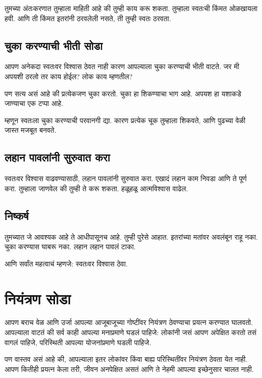 तुमच्या अंतःकरणात तुम्हाला माहिती आहे की तुम्ही काय करू शकता. 
तुम्हाला स्वतःची किंमत ओळखायला हवी. 
आणि ती किंमत इतरांनी ठरवलेली नसते, 
ती तुम्ही स्वतः ठरवता. 

\section*{चुका करण्याची भीती सोडा}
आपण अनेकदा स्वतःवर विश्वास ठेवत नाही कारण 
आपल्याला चुका करण्याची भीती वाटते. 
जर मी अपयशी ठरलो तर काय होईल? 
लोक काय म्हणतील? 

पण सत्य असं आहे की प्रत्येकजण चुका करतो. 
चुका हा शिकण्याचा भाग आहे. 
अपयश हा यशाकडे जाण्याचा एक टप्पा आहे. 

म्हणून स्वतःला चुका करण्याची परवानगी द्या. 
कारण प्रत्येक चूक तुम्हाला शिकवते, 
आणि पुढच्या वेळी जास्त मजबूत बनवते. 

\section*{लहान पावलांनी सुरुवात करा}
स्वतःवर विश्वास वाढवण्यासाठी, 
लहान पावलांनी सुरुवात करा. 
एखादं लहान काम निवडा आणि ते पूर्ण करा. 
तुम्हाला जाणवेल की तुम्ही ते करू शकता. 
हळूहळू आत्मविश्वास वाढेल. 

\section*{निष्कर्ष}
तुमच्यात जे आवश्यक आहे ते आधीपासूनच आहे. 
तुम्ही पुरेसे आहात. 
इतरांच्या मतांवर अवलंबून राहू नका. 
चुका करण्यास घाबरू नका. 
लहान लहान पावलं टाका. 

आणि सर्वांत महत्वाचं म्हणजे: 
स्वतःवर विश्वास ठेवा. 



\chapter{नियंत्रण सोडा}

आपण बराच वेळ आणि उर्जा आपल्या आजूबाजूच्या गोष्टींवर नियंत्रण ठेवण्याचा प्रयत्न करण्यात घालवतो.  
आपल्याला वाटतं की सर्व काही आपल्या मनाप्रमाणे घडलं पाहिजे:  
लोकांनी जसं आपण अपेक्षित करतो तसं वागलं पाहिजे,  
परिस्थिती आपल्या योजनांप्रमाणे घडली पाहिजे.  

पण वास्तव असं आहे की,  
आपल्याला इतर लोकांवर किंवा बाह्य परिस्थितींवर नियंत्रण ठेवता येत नाही.  
आपण कितीही प्रयत्न केला तरी,  
जीवन अनपेक्षित असतं आणि ते नेहमी आपल्या इच्छेनुसार चालत नाही.  

